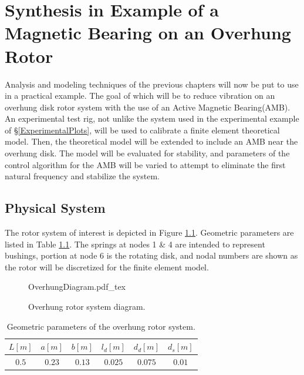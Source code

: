 \chapter{Synthesis in Example of a Magnetic Bearing on an Overhung Rotor}
Analysis and modeling techniques of the previous chapters will now be put to use in a practical example. The goal of which will be to reduce vibration on an overhung disk rotor system with the use of an Active Magnetic Bearing(AMB). An experimental test rig, not unlike the system used in the experimental example of \S\ref{ExperimentalPlots}, will be used to calibrate a  finite element theoretical model. Then, the theoretical model will be extended to include an AMB near the overhung disk. The model will be evaluated for stability, and parameters of the control algorithm for the AMB will be varied to attempt to eliminate the first natural frequency and stabilize the system.
\section{Physical System}
The rotor system of interest is depicted in Figure \ref{fig:OverhungDiagram}. Geometric parameters are listed in Table \ref{tab:GeometricParametersofOverhung}. The springs at nodes 1 \& 4 are intended to represent bushings, portion at node 6 is the rotating disk, and nodal numbers are shown as the rotor will be discretized for the finite element model.
\begin{figure}
	\centering
	\def\svgwidth{250pt}
	{OverhungDiagram.pdf_tex}
	\caption{Overhung rotor system diagram.}
	\label{fig:OverhungDiagram}
\end{figure}
\begin{table}
	\centering
	\caption{Geometric parameters of the overhung rotor system.}
	\label{tab:GeometricParametersofOverhung}
	\begin{tabular}{cccccc}
		$ L[m] $&$ a[m] $&$ b[m] $&$ l_d[m] $&$ d_d[m] $&$ d_s[m] $\\\hline
		$ 0.5 $&$ 0.23 $&$ 0.13 $&$ 0.025 $&$ 0.075 $&$ 0.01 $
		\end{tabular}
\end{table}

